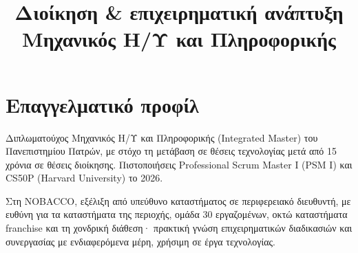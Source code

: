 \documentclass[10pt,a4paper,sans]{moderncv}
\title{Διοίκηση \& επιχειρηματική ανάπτυξη\texorpdfstring{\\}{ · }Μηχανικός Η/Υ και Πληροφορικής}  %
\let\cvsectionplain\section
\renewcommand*{\section}[1]{\par\ifdim\dimexpr\pagegoal-\pagetotal\relax<5\baselineskip\newpage\fi\cvsectionplain{#1}}
\begin{document}
\makecvtitle

\section{Επαγγελματικό προφίλ}
Διπλωματούχος Μηχανικός Η/Υ και Πληροφορικής (Integrated Master) του Πανεπιστημίου Πατρών, με στόχο τη μετάβαση σε θέσεις τεχνολογίας μετά από 15 χρόνια σε θέσεις διοίκησης. Πιστοποιήσεις Professional Scrum Master I (PSM I) και CS50P (Harvard University) το 2026.

\smallskip
Στη NOBACCO, εξέλιξη από υπεύθυνο καταστήματος σε περιφερειακό διευθυντή, με ευθύνη για τα καταστήματα της περιοχής, ομάδα 30 εργαζομένων, οκτώ καταστήματα franchise και τη χονδρική διάθεση· πρακτική γνώση επιχειρηματικών διαδικασιών και συνεργασίας με ενδιαφερόμενα μέρη, χρήσιμη σε έργα τεχνολογίας.
\end{document}
